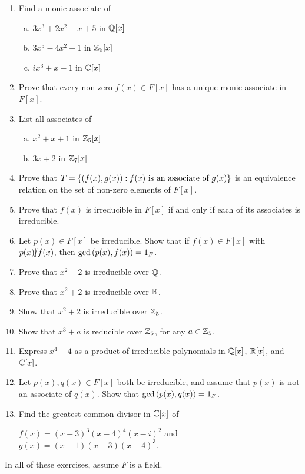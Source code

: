 \documentclass[11pt,fleqn,dvipsnames,usenames]{article}
\newcommand{\p}{\noindent}
\begin{document}
\begin{enumerate}
\item Find a monic associate of
\begin{enumerate}[(a)]
\item $3x^3 + 2x^2 + x + 5$ in $\mathbb{Q}[x]$
\item $3x^5 - 4x^2 + 1$ in $\mathbb{Z}_{5}[x]$
\item $ix^3 + x - 1$ in $\mathbb{C}[x]$
\end{enumerate}
\item Prove that every non-zero $f(x)\in F[x]$ has a unique monic associate in $F[x]$.
\item List all associates of
\begin{enumerate}[(a)]
\item $x^2 + x + 1$ in $\mathbb{Z}_{5}[x]$
\item $3x + 2$ in $\mathbb{Z}_{7}[x]$
\end{enumerate}
\item Prove that $T = \left\{(f(x),g(x)):f(x)\text{ is an associate of } g(x)\right\}$ is an equivalence relation on the set of non-zero elements of $F[x]$.
\item Prove that $f(x)$ is irreducible in $F[x]$ if and only if each of its associates is irreducible.
\item Let $p(x)\in F[x]$ be irreducible.  Show that if $f(x)\in F[x]$ with $p(x)|\kern-0.9ex{/} f(x)$, then $\text{gcd}\left(p(x),f(x)\right) = 1_{F}$.
\item Prove that $x^2 - 2$ is irreducible over $\mathbb{Q}$.
\item Prove that $x^2 + 2$ is irreducible over $\mathbb{R}$.
\item Show that $x^2 + 2$ is irreducible over $\mathbb{Z}_5$.
\item Show that $x^3 + a$ is reducible over $\mathbb{Z}_5$, for any $a\in \mathbb{Z}_5$.
\item Express $x^4 - 4$ as a product of irreducible polynomials in $\mathbb{Q}[x]$, $\mathbb{R}[x]$, and $\mathbb{C}[x]$.
\item Let $p(x),q(x)\in F[x]$ both be irreducible, and assume that $p(x)$ is not an associate of $q(x)$.  Show that $\text{gcd}\left(p(x),q(x)\right) = 1_{F}$.
\item Find the greatest common divisor in $\mathbb{C}[x]$ of
\begin{center}
$f(x) = (x-3)^3(x-4)^4(x-i)^2$ and $g(x) = (x-1)(x-3)(x-4)^3$.
\end{center}
\end{enumerate}
\newpage

\p {\huge \S5.4 Problems}
\vsp

\p In all of these exercises, assume $F$ is a field.
\end{document}
